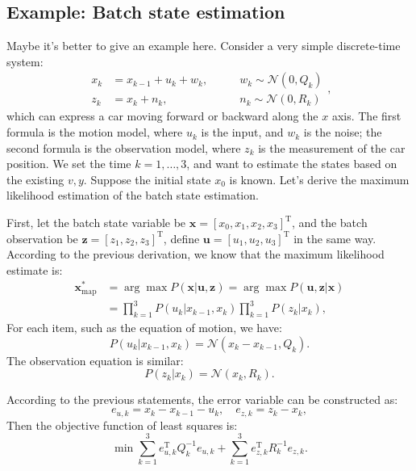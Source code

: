 \subsection{Example: Batch state estimation}
Maybe it's better to give an example here. Consider a very simple discrete-time system:
\begin{equation}
    \begin{array}{lll}
        {x_k} &= {x_{k-1}} + {u_k} + {w_k},&\qquad w_k \sim \mathcal{N}\left( {0,Q_k} \right)\\
        {z_k} &= {x_k} + {n_k},&\qquad {n_k}\sim \mathcal{N}\left( {0,R_k} \right)
    \end{array},
\end{equation}
which can express a car moving forward or backward along the $x$ axis. The first formula is the motion model, where $u_k$ is the input, and $w_k$ is the noise; the second formula is the observation model, where $z_k$ is the measurement of the car position. We set the time $k=1,\ldots,3$, and want to estimate the states based on the existing $v,y$. Suppose the initial state $x_0$ is known. Let's derive the maximum likelihood estimation of the batch state estimation.

First, let the batch state variable be $\bm{x} = [x_0,x_1, x_2, x_3]^\mathrm{T}$, and the batch observation be $\bm{z} = [z_1,z_2,z_3]^ \mathrm{T}$, define $\bm{u}=[u_1,u_2,u_3]^\mathrm{T}$ in the same way. According to the previous derivation, we know that the maximum likelihood estimate is:
\begin{equation}
    \begin{aligned}
        {\bm{x}_{\mathrm{map}}^*} &= \arg \max P(\bm{x}|\bm{u},\bm{z}) = \arg \max P( \bm{u},\bm{z}|\bm{x})\\
        &= \prod\limits_{k = 1}^3 {P({u_k}|{x_{k-1}},{x_k})\prod\limits_{k = 1}^3 {P\left( { {z_k}|{x_k}} \right)} },
    \end{aligned}
\end{equation}
For each item, such as the equation of motion, we have:
\begin{equation}
    P({u_k}|{x_{k-1}},{x_k}) = \mathcal{N}({x_k}-{x_{k-1}},{Q_k}).
\end{equation}
The observation equation is similar:
\begin{equation}
    P\left( {{z_k}|{x_k}} \right) = \mathcal{N}\left( {{x_k},{R_k}} \right).
\end{equation}

According to the previous statements, the error variable can be constructed as:
\begin{equation}
    {e_{u,k}} = {x_k}-{x_{k-1}}-{u_k}, \quad {e_{z,k}} = {z_k}-{x_k},
\end{equation}
Then the objective function of least squares is:
\begin{equation}
    \min \sum\limits_{k = 1}^3 {e_{u,k}^\mathrm{T} Q_k^{-1}{e_{u,k}}} + \sum\limits_{k = 1 }^3 {e_{z,k}^\mathrm{T}{R^{-1}_k}{e_{z,k}}}.
\end{equation}

